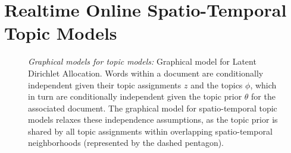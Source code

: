 \section{Realtime Online Spatio-Temporal Topic Models}
\begin{figure}
\begin{center}

 \hfill
{}
\end{center}

\caption{
	\emph{Graphical models for topic models:}
	\protect{} Graphical model for Latent Dirichlet Allocation. Words within a document are conditionally independent given their topic assignments $z$ and the topics $\phi$, which in turn are conditionally independent given the topic prior $\theta$ for the associated document.
	\protect{} The graphical model for spatio-temporal topic models relaxes these independence assumptions, as the topic prior is shared by all topic assignments within overlapping spatio-temporal neighborhoods (represented by the dashed pentagon).
}
\label{fig:pgms}
\end{figure}

